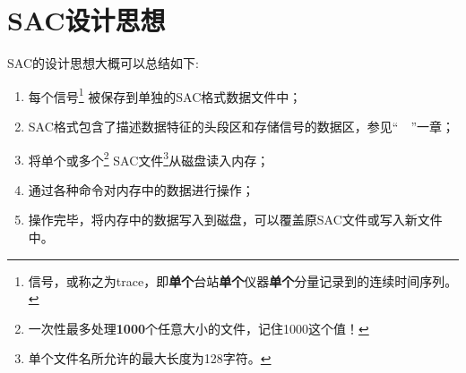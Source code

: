 \section{SAC设计思想}
SAC的设计思想大概可以总结如下:
\begin{enumerate}
    \item 每个信号\footnote{信号，或称之为trace，即\textbf{单个}台站\textbf{单个}仪器\textbf{单个}分量记录到的连续时间序列。}
被保存到单独的SAC格式数据文件中；
\item SAC格式包含了描述数据特征的头段区和存储信号的数据区，参见``~~''一章；
\item 将单个或多个\footnote{一次性最多处理\textbf{1000}个任意大小的文件，记住1000这个值！}
    SAC文件\footnote{单个文件名所允许的最大长度为128字符。}从磁盘读入内存；
\item 通过各种命令对内存中的数据进行操作；
\item 操作完毕，将内存中的数据写入到磁盘，可以覆盖原SAC文件或写入新文件中。
\end{enumerate}
